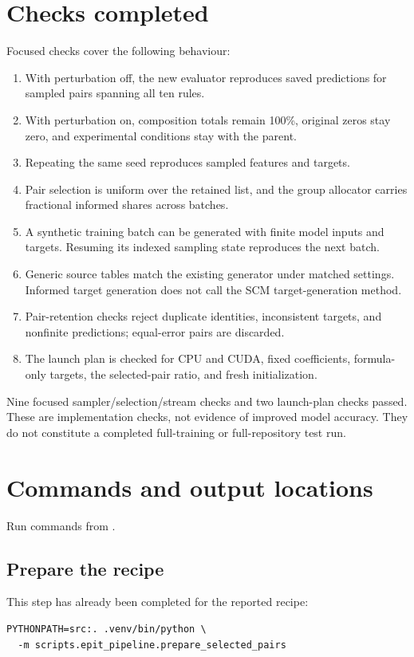 \documentclass[11pt]{article}
\begin{document}
\section{Checks completed}
Focused checks cover the following behaviour:
\begin{enumerate}
\item With perturbation off, the new evaluator reproduces saved predictions for
      sampled pairs spanning all ten rules.
\item With perturbation on, composition totals remain 100\%, original zeros stay
      zero, and experimental conditions stay with the parent.
\item Repeating the same seed reproduces sampled features and targets.
\item Pair selection is uniform over the retained list, and the group allocator
      carries fractional informed shares across batches.
\item A synthetic training batch can be generated with finite model inputs and
      targets. Resuming its indexed sampling state reproduces the next batch.
\item Generic source tables match the existing generator under matched settings.
      Informed target generation does not call the SCM target-generation method.
\item Pair-retention checks reject duplicate identities, inconsistent targets,
      and nonfinite predictions; equal-error pairs are discarded.
\item The launch plan is checked for CPU and CUDA, fixed coefficients,
      formula-only targets, the selected-pair ratio, and fresh initialization.
\end{enumerate}
Nine focused sampler/selection/stream checks and two launch-plan checks passed.
These are implementation checks, not evidence of improved model accuracy. They
do not constitute a completed full-training or full-repository test run.

\section{Commands and output locations}
Run commands from .

\subsection{Prepare the recipe}
This step has already been completed for the reported recipe:
\begin{verbatim}
PYTHONPATH=src:. .venv/bin/python \
  -m scripts.epit_pipeline.prepare_selected_pairs
\end{verbatim}
\end{document}
